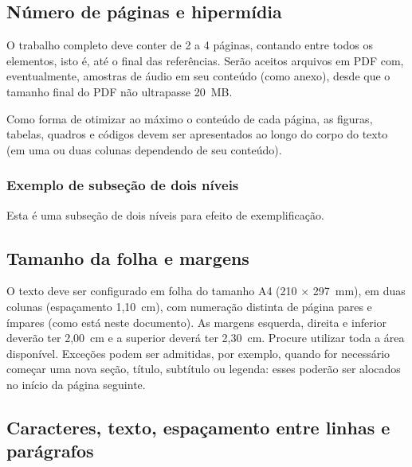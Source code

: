 \documentclass[12pt, a4paper, twoside, twocolumn]{article}
\begin{document}
\subsection{Número de páginas e hipermídia}

O trabalho completo deve conter de 2 a 4 páginas, contando entre todos os elementos, isto é, até o final das referências. Serão aceitos arquivos em PDF com, eventualmente, amostras de áudio em seu conteúdo (como anexo), desde que o tamanho final do PDF não ultrapasse 20~MB.

Como forma de otimizar ao máximo o conteúdo de cada página, as figuras, tabelas, quadros e códigos devem ser apresentados ao longo do corpo do texto (em uma ou duas colunas dependendo de seu conteúdo).

\subsubsection{Exemplo de subseção de dois níveis}

Esta é uma subseção de dois níveis para efeito de exemplificação.

\vspace{-0.15\baselineskip}
\subsection{Tamanho da folha e margens}

O texto deve ser configurado em folha do tamanho A4 (210 $\times$ 297~mm), em duas colunas (espaçamento 1,10~cm), com numeração distinta de página pares e ímpares (como está neste documento). As margens esquerda, direita e inferior deverão ter 2,00~cm e a superior deverá ter 2,30~cm. Procure utilizar toda a área disponível. Exceções podem ser admitidas, por exemplo, quando for necessário começar uma nova seção, título, subtítulo ou legenda: esses poderão ser alocados no início da página seguinte.

\subsection{Caracteres, texto, espaçamento entre linhas e parágrafos}
\end{document}
